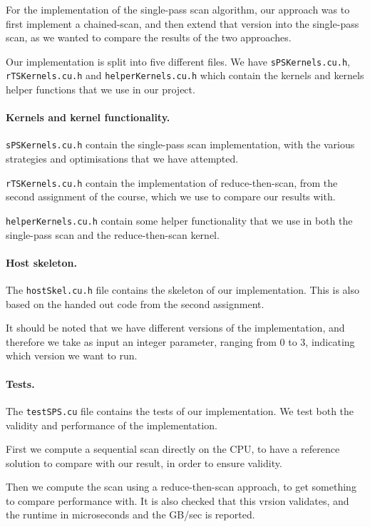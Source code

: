 For the implementation of the single-pass scan algorithm, our approach was to first implement a chained-scan, and then extend that version into the single-pass scan, as we wanted to compare the results of the two approaches.

Our implementation is split into five different files.
We have \texttt{sPSKernels.cu.h}, \texttt{rTSKernels.cu.h} and \texttt{helperKernels.cu.h} which contain the kernels and kernels helper functions that we use in our project.

\paragraph{Kernels and kernel functionality.}
\texttt{sPSKernels.cu.h} contain the single-pass scan implementation, with the various strategies and optimisations that we have attempted.

\texttt{rTSKernels.cu.h} contain the implementation of reduce-then-scan, from the second assignment of the course, which we use to compare our results with.

\texttt{helperKernels.cu.h} contain some helper functionality that we use in both the single-pass scan and the reduce-then-scan kernel.

\paragraph{Host skeleton.}
The \texttt{hostSkel.cu.h} file contains the skeleton of our implementation. This is also based on the handed out code from the second assignment.

It should be noted that we have different versions of the implementation, and therefore we take as input an integer parameter, ranging from $0$ to $3$, indicating which version we want to run.

\paragraph{Tests.}
The \texttt{testSPS.cu} file contains the tests of our implementation.
We test both the validity and performance of the implementation.

First we compute a sequential scan directly on the CPU, to have a reference solution to compare with our result, in order to ensure validity.

Then we compute the scan using a reduce-then-scan approach, to get something to compare performance with. It is also checked that this vrsion validates, and the runtime in microseconds and the GB/sec is reported.

